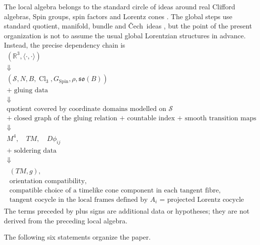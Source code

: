 \documentclass[11pt,a4paper]{article}
\theoremstyle{definition}
\theoremstyle{remark}
\newcommand{\R}{\mathbb{R}}
\newcommand{\Smodel}{\mathcal{S}}
\newcommand{\Cl}{\operatorname{Cl}}
\newcommand{\SpinG}{G_{\mathrm{Spin}}}
\newcommand{\Cech}{\ifmmode\text{\v{C}ech}\else\v{C}ech\fi}
\newcommand{\soB}{\mathfrak{so}(B)}
\begin{document}
The local algebra belongs to the standard circle of ideas around real
Clifford algebras, Spin groups, spin factors and Lorentz cones
\cite{Chevalley,LawsonMichelsohn,JordanNeumannWigner,FarautKoranyi}.
The global steps use standard quotient, manifold, bundle and \Cech\ ideas
\cite{LeeSmooth,Husemoller,Steenrod,KobayashiNomizu}, but the point of the
present organization is not to assume the usual global Lorentzian structures
in advance.  Instead, the precise dependency chain is
\[
\boxed{
\begin{array}{c}
(\R^{3},\langle\cdot,\cdot\rangle)
\\[0.25em]\Downarrow\\[-0.15em]
(\Smodel,N,B,\Cl_{3},\SpinG,\rho,\soB)
\\[0.25em]
+\;\text{gluing data}
\\[-0.05em]\Downarrow\\[-0.15em]
\text{quotient covered by coordinate domains modelled on }\Smodel
\\[0.25em]
+\;\text{closed graph of the gluing relation + countable index + smooth transition maps}
\\[-0.05em]\Downarrow\\[-0.15em]
M^{4},\quad TM,\quad D\phi_{ij}
\\[0.25em]
+\;\text{soldering data}
\\[-0.05em]\Downarrow\\[-0.15em]
\begin{gathered}
(TM,g),\\
\text{orientation compatibility},\\
\text{compatible choice of a timelike cone component in each tangent fibre},\\
\text{tangent cocycle in the local frames defined by }A_i\text{ = projected Lorentz cocycle}
\end{gathered}
\end{array}}
\tag{1.1}
\]
The terms preceded by plus signs are additional data or hypotheses; they are not
derived from the preceding local algebra.

The following six statements organize the paper.
\end{document}
